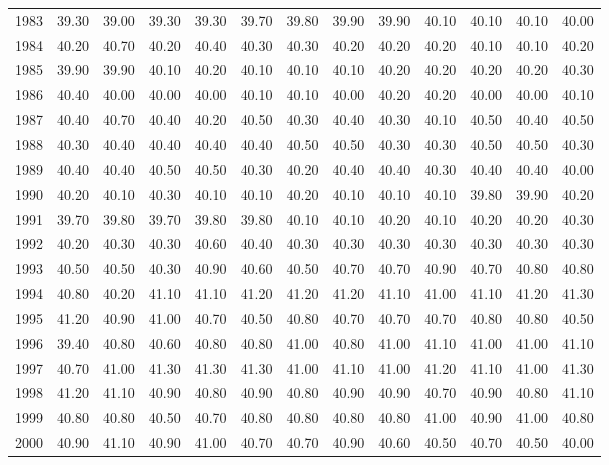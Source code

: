 \begin{longtable}{rrrrrrrrrrrrr}
  1983 & 39.30 & 39.00 & 39.30 & 39.30 & 39.70 & 39.80 & 39.90 & 39.90 & 40.10 & 40.10 & 40.10 & 40.00 \\ 
  1984 & 40.20 & 40.70 & 40.20 & 40.40 & 40.30 & 40.30 & 40.20 & 40.20 & 40.20 & 40.10 & 40.10 & 40.20 \\ 
  1985 & 39.90 & 39.90 & 40.10 & 40.20 & 40.10 & 40.10 & 40.10 & 40.20 & 40.20 & 40.20 & 40.20 & 40.30 \\ 
  1986 & 40.40 & 40.00 & 40.00 & 40.00 & 40.10 & 40.10 & 40.00 & 40.20 & 40.20 & 40.00 & 40.00 & 40.10 \\ 
  1987 & 40.40 & 40.70 & 40.40 & 40.20 & 40.50 & 40.30 & 40.40 & 40.30 & 40.10 & 40.50 & 40.40 & 40.50 \\ 
  1988 & 40.30 & 40.40 & 40.40 & 40.40 & 40.40 & 40.50 & 40.50 & 40.30 & 40.30 & 40.50 & 40.50 & 40.30 \\ 
  1989 & 40.40 & 40.40 & 40.50 & 40.50 & 40.30 & 40.20 & 40.40 & 40.40 & 40.30 & 40.40 & 40.40 & 40.00 \\ 
  1990 & 40.20 & 40.10 & 40.30 & 40.10 & 40.10 & 40.20 & 40.10 & 40.10 & 40.10 & 39.80 & 39.90 & 40.20 \\ 
  1991 & 39.70 & 39.80 & 39.70 & 39.80 & 39.80 & 40.10 & 40.10 & 40.20 & 40.10 & 40.20 & 40.20 & 40.30 \\ 
  1992 & 40.20 & 40.30 & 40.30 & 40.60 & 40.40 & 40.30 & 40.30 & 40.30 & 40.30 & 40.30 & 40.30 & 40.30 \\ 
  1993 & 40.50 & 40.50 & 40.30 & 40.90 & 40.60 & 40.50 & 40.70 & 40.70 & 40.90 & 40.70 & 40.80 & 40.80 \\ 
  1994 & 40.80 & 40.20 & 41.10 & 41.10 & 41.20 & 41.20 & 41.20 & 41.10 & 41.00 & 41.10 & 41.20 & 41.30 \\ 
  1995 & 41.20 & 40.90 & 41.00 & 40.70 & 40.50 & 40.80 & 40.70 & 40.70 & 40.70 & 40.80 & 40.80 & 40.50 \\ 
  1996 & 39.40 & 40.80 & 40.60 & 40.80 & 40.80 & 41.00 & 40.80 & 41.00 & 41.10 & 41.00 & 41.00 & 41.10 \\ 
  1997 & 40.70 & 41.00 & 41.30 & 41.30 & 41.30 & 41.00 & 41.10 & 41.00 & 41.20 & 41.10 & 41.00 & 41.30 \\ 
  1998 & 41.20 & 41.10 & 40.90 & 40.80 & 40.90 & 40.80 & 40.90 & 40.90 & 40.70 & 40.90 & 40.80 & 41.10 \\ 
  1999 & 40.80 & 40.80 & 40.50 & 40.70 & 40.80 & 40.80 & 40.80 & 40.80 & 41.00 & 40.90 & 41.00 & 40.80 \\ 
  2000 & 40.90 & 41.10 & 40.90 & 41.00 & 40.70 & 40.70 & 40.90 & 40.60 & 40.50 & 40.70 & 40.50 & 40.00 \\ 

\end{longtable}
